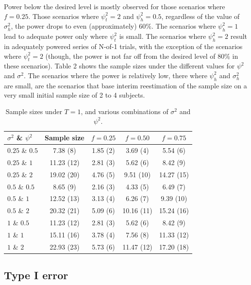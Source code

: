 \documentclass[AMA,STIX1COL,]{WileyNJD-v2}
\begin{document}
Power below the desired level is mostly observed for those scenarios where \(f=0.25\). Those scenarios where \(\psi_t^2 = 2\) and \(\psi_h^2 = 0.5\), regardless of the value of \(\sigma_h^2\), the power drops to even (approximately) 60\%. The scenarios where \(\psi_h^2 = 1\) lead to adequate power only where \(\psi_t^2\) is small. The scenarios where \(\psi_h^2 = 2\) result in adequately powered series of N-of-1 trials, with the exception of the scenarios where \(\psi_t^2 = 2\) (though, the power is not far off from the desired level of 80\% in these scenarios). Table 2 shows the sample sizes under the different values for \(\psi^2\) and \(\sigma^2\). The scenarios where the power is relatively low, there where \(\psi_h^2\) and \(\sigma_h^2\) are small, are the scenarios that base interim reestimation of the sample size on a very small initial sample size of 2 to 4 subjects.

\begin{table}[h] \label{table1}
\begin{center}
\caption{Sample sizes under $T = 1$, and various combinations of $\sigma^2$ and $\psi^2$.}
\begin{tabular}{l c c c c} 
\hline
$\sigma^2$ \& $\psi^2$ & Sample size & $f = 0.25$ & $f = 0.50$ & $f = 0.75$ \\
\hline 
$0.25$ \& $0.5$ & 7.38 (8) & 1.85 (2) & 3.69 (4) & 5.54 (6) \\
$0.25$ \& $1$ & 11.23 (12) & 2.81 (3) & 5.62 (6) & 8.42 (9) \\
$0.25$ \& $2$ & 19.02 (20) & 4.76 (5) & 9.51 (10) & 14.27 (15) \\
$0.5$ \& $0.5$ & 8.65 (9) & 2.16 (3) & 4.33 (5) & 6.49 (7) \\
$0.5$ \& $1$ & 12.52 (13) & 3.13 (4) & 6.26 (7) & 9.39 (10) \\
$0.5$ \& $2$ & 20.32 (21) & 5.09 (6) & 10.16 (11) & 15.24 (16) \\
$1$ \& $0.5$ & 11.23 (12) & 2.81 (3) & 5.62 (6) & 8.42 (9) \\
$1$ \& $1$ & 15.11 (16) & 3.78 (4) & 7.56 (8) & 11.33 (12) \\
$1$ \& $2$ & 22.93 (23) & 5.73 (6) & 11.47 (12) & 17.20 (18) \\
\hline 
\end{tabular}
\end{center}
\end{table}

\hypertarget{type-i-error}{%
\subsection{Type I error}\label{type-i-error}}
\end{document}
